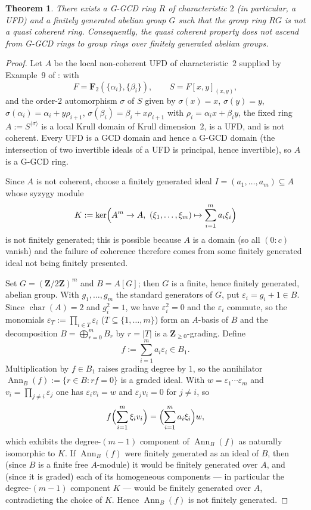 \documentclass[11pt,reqno]{amsart}
\numberwithin{equation}{section}
\newtheorem{theorem}[thm]{Theorem}
\theoremstyle{definition}
\begin{document}
\begin{theorem}\label{thm:4aii}
There exists a G-GCD ring $R$ of characteristic $2$ (in particular,
a UFD) and a finitely generated abelian group $G$ such that the group
ring $RG$ is not a quasi coherent ring. Consequently, the quasi
coherent property does not ascend from G-GCD rings to group rings over
finitely generated abelian groups.
\end{theorem}

\begin{proof}
Let $A$ be the local non-coherent UFD of
characteristic~$2$ supplied by Example~9 of \cite{Glaz2000-FCRZD}: with
\[
   F=\mathbf F_2(\{\alpha_i\},\{\beta_i\}),\qquad S=F[x,y]_{(x,y)},
\]
and the order-$2$ automorphism $\sigma$ of $S$ given by $\sigma(x)=x$,
$\sigma(y)=y$, $\sigma(\alpha_i)=\alpha_i+y\rho_{i+1}$,
$\sigma(\beta_i)=\beta_i+x\rho_{i+1}$ with
$\rho_i=\alpha_i x+\beta_i y$, the fixed ring
$A:=S^{\langle\sigma\rangle}$ is a local Krull domain of Krull
dimension~$2$, is a UFD, and is not coherent. Every UFD is a GCD domain
and hence a G-GCD domain (the intersection of two invertible ideals of a
UFD is principal, hence invertible), so $A$ is a G-GCD ring.

Since $A$ is not coherent, choose a finitely generated ideal
$I=(a_1,\dots,a_m)\subseteq A$ whose syzygy module
\[
   K:=\ker\Bigl(A^m\to A,\ (\xi_1,\dots,\xi_m)\mapsto\sum_{i=1}^m a_i\xi_i\Bigr)
\]
is not finitely generated; this is possible because $A$ is a domain (so
all $(0:c)$ vanish) and the failure of coherence therefore comes from
some finitely generated ideal not being finitely presented.

Set $G=(\mathbf Z/2\mathbf Z)^m$ and $B=A[G]$; then $G$ is a finite,
hence finitely generated, abelian group. With $g_1,\dots,g_m$ the
standard generators of $G$, put $\varepsilon_i=g_i+1\in B$. Since
$\operatorname{char}(A)=2$ and $g_i^2=1$, we have $\varepsilon_i^2=0$
and the $\varepsilon_i$ commute, so the monomials
$\varepsilon_T:=\prod_{i\in T}\varepsilon_i$ ($T\subseteq\{1,\dots,m\}$)
form an $A$-basis of $B$ and the decomposition
$B=\bigoplus_{r=0}^m B_r$ by $r=|T|$ is a $\mathbf Z_{\ge 0}$-grading.
Define
\[
   f:=\sum_{i=1}^m a_i\varepsilon_i\in B_1.
\]
Multiplication by $f\in B_1$ raises grading degree by $1$, so the
annihilator $\operatorname{Ann}_B(f):=\{r\in B:rf=0\}$ is a graded
ideal. With
$w=\varepsilon_1\cdots\varepsilon_m$ and $v_i=\prod_{j\ne i}\varepsilon_j$
one has $\varepsilon_i v_i=w$ and $\varepsilon_j v_i=0$ for $j\ne i$, so
\[
   f\Bigl(\sum_{i=1}^m \xi_i v_i\Bigr)=\Bigl(\sum_{i=1}^m a_i\xi_i\Bigr)w,
\]
which exhibits the degree-$(m-1)$ component of $\operatorname{Ann}_B(f)$ as
naturally isomorphic to $K$. If $\operatorname{Ann}_B(f)$ were
finitely generated as an ideal of $B$, then (since $B$ is a finite free
$A$-module) it would be finitely generated over $A$, and (since it is
graded) each of its homogeneous components --- in particular the
degree-$(m-1)$ component $K$ --- would be finitely generated over $A$,
contradicting the choice of $K$. Hence $\operatorname{Ann}_B(f)$ is
not finitely generated.


\end{proof}
\end{document}

